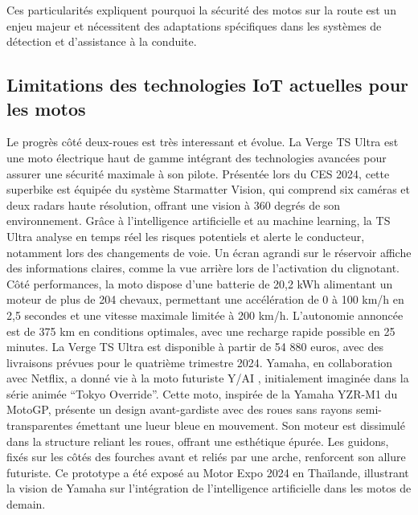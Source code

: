 \documentclass{article}
\begin{document}
\vspace{0.5cm} %
Ces particularités expliquent pourquoi la sécurité des motos sur la route est un enjeu majeur et nécessitent des adaptations spécifiques dans les systèmes de détection et d’assistance à la conduite. 

\subsection{Limitations des technologies IoT actuelles pour les motos}


Le progrès côté deux-roues est très interessant et évolue.
La Verge TS Ultra est une moto électrique \cite{lenoir_cette_2024} haut de gamme intégrant des technologies avancées pour assurer une sécurité maximale à son pilote. Présentée lors du CES 2024, cette superbike est équipée du système Starmatter Vision, qui comprend six caméras et deux radars haute résolution, offrant une vision à 360 degrés de son environnement. Grâce à l’intelligence artificielle et au machine learning, la TS Ultra analyse en temps réel les risques potentiels et alerte le conducteur, notamment lors des changements de voie. Un écran agrandi sur le réservoir affiche des informations claires, comme la vue arrière lors de l’activation du clignotant. Côté performances, la moto dispose d’une batterie de 20,2 kWh alimentant un moteur de plus de 204 chevaux, permettant une accélération de 0 à 100 km/h en 2,5 secondes et une vitesse maximale limitée à 200 km/h. L’autonomie annoncée est de 375 km en conditions optimales, avec une recharge rapide possible en 25 minutes. La Verge TS Ultra est disponible à partir de 54 880 euros, avec des livraisons prévues pour le quatrième trimestre 2024.
Yamaha, en collaboration avec Netflix, a donné vie à la moto futuriste Y/AI \cite{texier_quand_2024} , initialement imaginée dans la série animée “Tokyo Override”. Cette moto, inspirée de la Yamaha YZR-M1 du MotoGP, présente un design avant-gardiste avec des roues sans rayons semi-transparentes émettant une lueur bleue en mouvement. Son moteur est dissimulé dans la structure reliant les roues, offrant une esthétique épurée. Les guidons, fixés sur les côtés des fourches avant et reliés par une arche, renforcent son allure futuriste. Ce prototype a été exposé au Motor Expo 2024 en Thaïlande, illustrant la vision de Yamaha sur l’intégration de l’intelligence artificielle dans les motos de demain.
\end{document}
